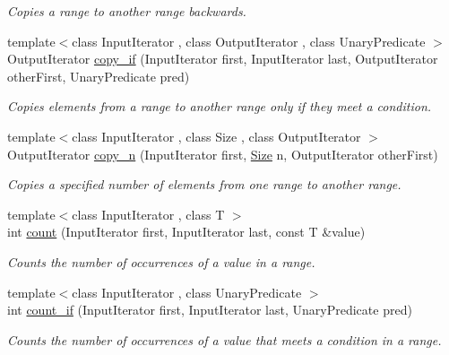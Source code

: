 \begin{DoxyCompactItemize}
\begin{DoxyCompactList}\small\item\em Copies a range to another range backwards. \end{DoxyCompactList}\item 
{\footnotesize template$<$class Input\+Iterator , class Output\+Iterator , class Unary\+Predicate $>$ }\\Output\+Iterator \hyperlink{namespaceprism_adcd8d05b64877fd3c6d1af2cfe3d3e81}{copy\+\_\+if} (Input\+Iterator first, Input\+Iterator last, Output\+Iterator other\+First, Unary\+Predicate pred)
\begin{DoxyCompactList}\small\item\em Copies elements from a range to another range only if they meet a condition. \end{DoxyCompactList}\item 
{\footnotesize template$<$class Input\+Iterator , class Size , class Output\+Iterator $>$ }\\Output\+Iterator \hyperlink{namespaceprism_af907f3f5637d4ec056e9b833b6272953}{copy\+\_\+n} (Input\+Iterator first, \hyperlink{classprism_1_1_size}{Size} n, Output\+Iterator other\+First)
\begin{DoxyCompactList}\small\item\em Copies a specified number of elements from one range to another range. \end{DoxyCompactList}\item 
{\footnotesize template$<$class Input\+Iterator , class T $>$ }\\int \hyperlink{namespaceprism_a024117fc3639cdf6598509edf22f034a}{count} (Input\+Iterator first, Input\+Iterator last, const T \&value)
\begin{DoxyCompactList}\small\item\em Counts the number of occurrences of a value in a range. \end{DoxyCompactList}\item 
{\footnotesize template$<$class Input\+Iterator , class Unary\+Predicate $>$ }\\int \hyperlink{namespaceprism_a124ac016ee2a8ab3844c9af6daf5b4a6}{count\+\_\+if} (Input\+Iterator first, Input\+Iterator last, Unary\+Predicate pred)
\begin{DoxyCompactList}\small\item\em Counts the number of occurrences of a value that meets a condition in a range. \end{DoxyCompactList}\item 

\end{DoxyCompactItemize}
